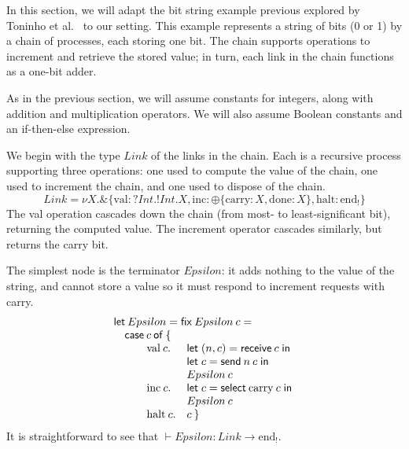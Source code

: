 \documentclass[orivec,envcountsame]{llncs}
\newcommand{\with}{\mathbin\binampersand}
\newcommand{\parr}{\mathbin\bindnasrepma}
\newcommand{\cpdual}[1]{#1^\perp}
\newcommand{\gvout}[2]{{!#1.#2}}
\newcommand{\gvin}[2]{{?#1.#2}}
\newcommand{\outterm}{\mathrm{end}_!}
\newcommand{\gvtyp}[3]{#1 \vdash #2 : #3}
\newcommand{\mkwd}[1]{\mathsf{#1}}
\newcommand{\link}[2]{#1 \leftrightarrow #2}
\newcommand{\clabel}[1]{\mathrm{#1}}
\newcommand{\sel}[2]{#1[\clabel{#2}]}
\newcommand{\gvsend}[2]{\mkwd{send}\:#1\:#2}
\newcommand{\gvreceive}[1]{\mkwd{receive}\:#1}
\newcommand{\gvlet}[3]{\mkwd{let}\;#1 = #2\;\mkwd{in}\;#3}
\newcommand{\gvselect}[2]{\mkwd{select}\:#1\:#2}
\newcommand{\lrkwd}{\mkwd{fix}}
\begin{document}
In this section, we will adapt the bit string example previous explored by Toninho et
al.~\cite{Toninho13} to our setting.  This example represents a string of bits (0 or 1) by a chain
of processes, each storing one bit.  The chain supports operations to increment and retrieve the
stored value; in turn, each link in the chain functions as a one-bit adder.

As in the previous section, we will assume constants for integers, along with addition and
multiplication operators.  We will also assume Boolean constants and an if-then-else expression.

We begin with the type $Link$ of the links in the chain.  Each is a recursive process supporting three
operations: one used to compute the value of the chain, one used to increment the chain, and one
used to dispose of the chain.
%
\[
 Link = \nu X. \with \{ \clabel{val}: \gvin{Int}{\gvout{Int}{X}}, \clabel{inc}: \oplus \{ \clabel{carry}: X, \clabel{done}: X \}, \clabel{halt}: \outterm \}
\]
The val operation cascades down the chain (from most- to least-significant bit), returning the
computed value.  The increment operator cascades similarly, but returns the carry bit.

The simplest node is the terminator $Epsilon$: it adds nothing to the value of the string, and
cannot store a value so it must respond to increment requests with carry.
%
%
\[\begin{array}{lll}
\mcl{3}{\mkwd{let}\:Epsilon = \lrkwd\:Epsilon\:c =} \\
\mcl{3}{\quad \mkwd{case}\:c\:\mkwd{of}\:\{} \\
\quad \quad & \clabel{val}\:c. &\gvlet{(n,c)}{\gvreceive{c}}{} \\
& & \gvlet{c}{\gvsend{n}{c}}{} \\
& & Epsilon\:c \\
& \clabel{inc}\:c. & \gvlet{c}{\gvselect{\clabel{carry}}{c}}{} \\
& & Epsilon\:c \\
& \clabel{halt}\:c. & c \: \}
\end{array}\]
It is straightforward to see that $\gvtyp{}{Epsilon}{Link \to \outterm}$.
\end{document}
